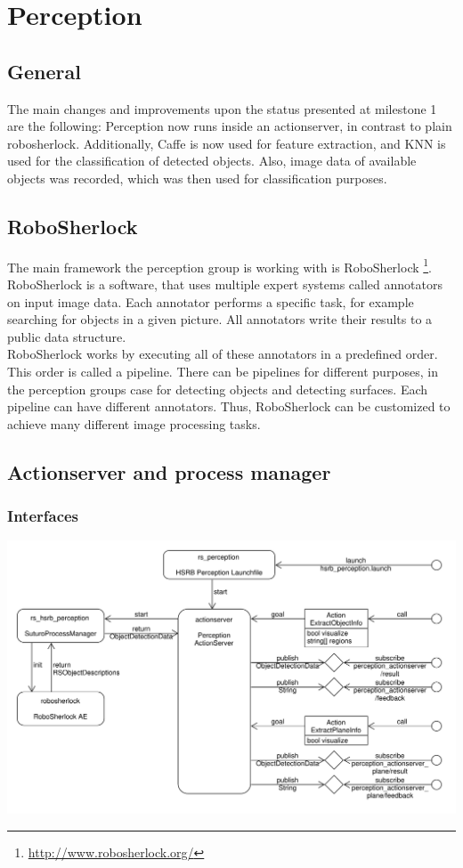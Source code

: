 \documentclass[main.tex]{subfiles}
\begin{document}
	\chapter{Perception}

		\section{General}
		The main changes and improvements upon the status presented at milestone 1 are the following: Perception now runs inside an actionserver, in contrast to 				plain robosherlock. Additionally, Caffe is now used for feature extraction, and KNN is used for the classification of detected objects. Also, image data of 		available objects was recorded, which was then used for classification purposes.
		
		\section{RoboSherlock}
		The main framework the perception group is working with is RoboSherlock \footnote{\url{http://www.robosherlock.org/}}. RoboSherlock is a software, that uses multiple expert systems called annotators on input image data. Each annotator performs a specific task, for example searching for objects in a given picture. All annotators write their results to a public data structure.\\
		
RoboSherlock works by executing all of these annotators in a predefined order. This order is called a pipeline. There can be pipelines for different purposes, in the perception groups case for detecting objects and detecting surfaces. Each pipeline can have different annotators. Thus, RoboSherlock can be customized to achieve many different image processing tasks.

		\section{Actionserver and process manager}
			\subsection{Interfaces}
			\includegraphics[width=\textwidth]{../architecture/perception_architecture/perception.pdf}
\end{document}
